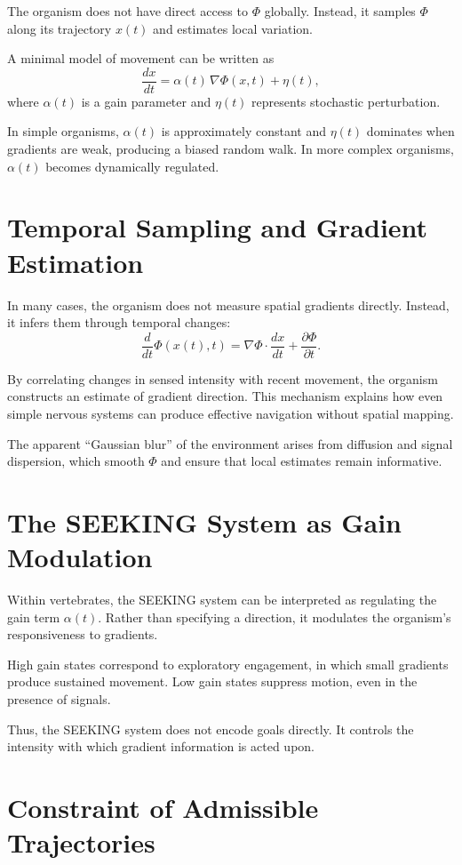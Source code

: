 \documentclass[11pt,oneside]{book}
\begin{document}
The organism does not have direct access to $\Phi$ globally. Instead, it samples $\Phi$ along its trajectory $x(t)$ and estimates local variation.

A minimal model of movement can be written as
\[
\frac{dx}{dt} = \alpha(t)\,\nabla \Phi(x,t) + \eta(t),
\]
where $\alpha(t)$ is a gain parameter and $\eta(t)$ represents stochastic perturbation.

In simple organisms, $\alpha(t)$ is approximately constant and $\eta(t)$ dominates when gradients are weak, producing a biased random walk. In more complex organisms, $\alpha(t)$ becomes dynamically regulated.

\section{Temporal Sampling and Gradient Estimation}

In many cases, the organism does not measure spatial gradients directly. Instead, it infers them through temporal changes:
\[
\frac{d}{dt}\Phi(x(t),t) = \nabla \Phi \cdot \frac{dx}{dt} + \frac{\partial \Phi}{\partial t}.
\]

By correlating changes in sensed intensity with recent movement, the organism constructs an estimate of gradient direction. This mechanism explains how even simple nervous systems can produce effective navigation without spatial mapping.

The apparent “Gaussian blur” of the environment arises from diffusion and signal dispersion, which smooth $\Phi$ and ensure that local estimates remain informative.

\section{The SEEKING System as Gain Modulation}

Within vertebrates, the SEEKING system can be interpreted as regulating the gain term $\alpha(t)$. Rather than specifying a direction, it modulates the organism’s responsiveness to gradients.

High gain states correspond to exploratory engagement, in which small gradients produce sustained movement. Low gain states suppress motion, even in the presence of signals.

Thus, the SEEKING system does not encode goals directly. It controls the intensity with which gradient information is acted upon.

\section{Constraint of Admissible Trajectories}
\end{document}
